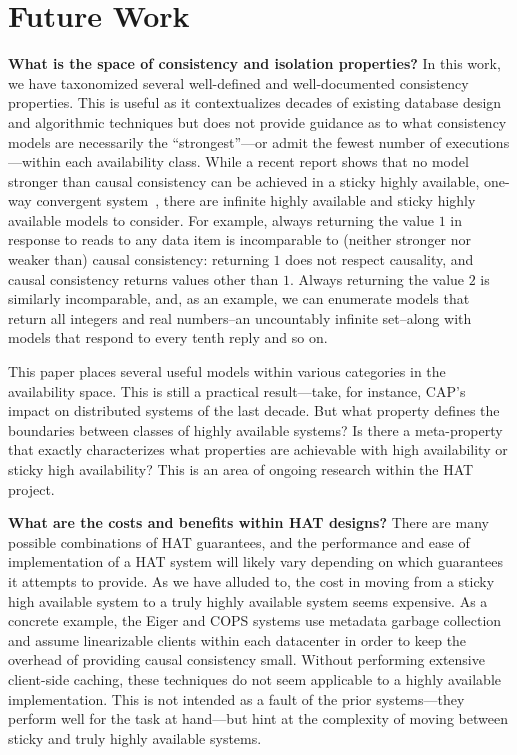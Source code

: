 
\section{Future Work}
\label{sec:futurework}

\textbf{What is the space of consistency and isolation properties?} In
this work, we have taxonomized several well-defined and
well-documented consistency properties. This is useful as it
contextualizes decades of existing database design and algorithmic
techniques but does not provide guidance as to what consistency models
are necessarily the ``strongest''---or admit the fewest number of
executions---within each availability class. While a recent report
shows that no model stronger than causal consistency can be achieved
in a sticky highly available, one-way convergent system~\cite{cac},
there are infinite highly available and sticky highly available models
to consider. For example, always returning the value $1$ in response
to reads to any data item is incomparable to (neither stronger nor
weaker than) causal consistency: returning $1$ does not respect
causality, and causal consistency returns values other than
$1$. Always returning the value $2$ is similarly incomparable, and, as
an example, we can enumerate models that return all integers and real
numbers--an uncountably infinite set--along with models that respond
to every tenth reply and so on.

This paper places several useful models within various categories in
the availability space. This is still a practical result---take, for
instance, CAP's impact on distributed systems of the last decade. But
what property defines the boundaries between classes of highly
available systems? Is there a meta-property that exactly characterizes
what properties are achievable with high availability or sticky high
availability? This is an area of ongoing research within the HAT
project.

\textbf{What are the costs and benefits within HAT designs?} There are
many possible combinations of HAT guarantees, and the performance and
ease of implementation of a HAT system will likely vary depending on
which guarantees it attempts to provide. As we have alluded to, the
cost in moving from a sticky high available system to a truly highly
available system seems expensive. As a concrete example, the Eiger and
COPS systems use metadata garbage collection and assume linearizable
clients within each datacenter in order to keep the overhead of
providing causal consistency small. Without performing extensive
client-side caching, these techniques do not seem applicable to a
highly available implementation. This is not intended as a fault of
the prior systems---they perform well for the task at hand---but hint
at the complexity of moving between sticky and truly highly available
systems.

